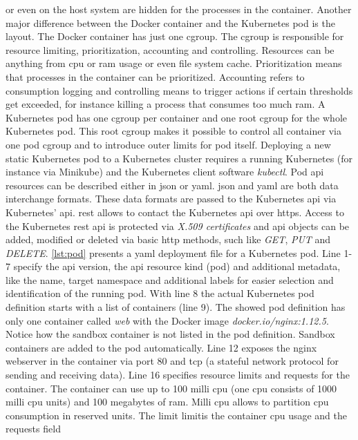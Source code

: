 \documentclass[titlepage]{report}
\begin{document}
or even on the host system are hidden for the processes in the container. Another major difference between the Docker container and the Kubernetes pod is the  layout. The Docker container has just one \gls{cgroup}. The \gls{cgroup}
is responsible for resource limiting, prioritization, accounting and controlling. Resources can be anything from \gls{cpu} or \gls{ram} usage or even file system cache\cite{singh2007containers}. Prioritization means that processes in the container can be prioritized.
Accounting refers to consumption logging and controlling means to trigger actions if certain thresholds get exceeded, for instance killing a process that consumes too much \gls{ram}. A Kubernetes pod has one \gls{cgroup} per container and one root \gls{cgroup}
for the whole Kubernetes pod. This root \gls{cgroup} makes it possible to control all container  via one pod \gls{cgroup} and to introduce outer limits for pod itself. Deploying a new static Kubernetes pod to a Kubernetes cluster requires
a running Kubernetes (for instance via Minikube) and the Kubernetes client software \emph{kubectl}. Pod \gls{api} resources can be described either in \gls{json} or \gls{yaml}. \gls{json} and \gls{yaml} are both data interchange formats. These data formats are passed to the Kubernetes
\gls{api} via Kubernetes'  \gls{api}. \gls{rest} allows to contact the Kubernetes \gls{api} over \gls{https}. Access to the Kubernetes \gls{rest} \gls{api} is protected via \emph{X.509 certificates} and \gls{api} objects can be added, modified or deleted via basic
\gls{http} methods, such like \emph{GET}, \emph{PUT} and \emph{DELETE}. \autoref{lst:pod} presents a \gls{yaml} deployment file for a Kubernetes pod. Line 1-7 specify the \gls{api} version, the \gls{api} resource kind (pod) and additional metadata, like the name,
target namespace and additional labels for easier selection and identification of the running pod. With line 8 the actual Kubernetes pod definition starts with a list of containers (line 9). The showed pod definition has only one container called \emph{web} 
with the Docker image \emph{docker.io/nginx:1.12.5}. Notice how the sandbox container is not listed in the pod definition. Sandbox containers are added to the pod automatically. Line 12 exposes the nginx webserver in the container via port 80 and \gls{tcp} (a stateful network protocol for sending and receiving data). Line 16 specifies resource limits and requests for the container.
The container can use up to 100 milli \gls{cpu} (one \gls{cpu} consists of 1000 milli \gls{cpu} units) and 100 megabytes of \gls{ram}. Milli \gls{cpu} allows to partition \gls{cpu} consumption in reserved units. The limit limitis the container \gls{cpu} usage and the requests field
\end{document}

